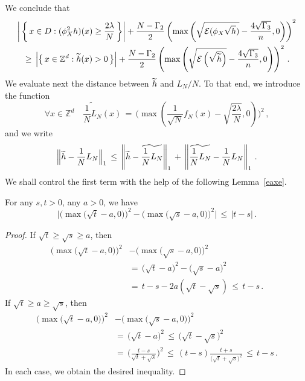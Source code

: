\documentclass[AHL, Unicode, longabstracts, published]{cedram}
\newcommand*\Zd {{\mathbb Z^d}}
\newcommand*\wh{{\tilde h}}
\newcommand{\cE}{\mathcal{E}}
\let\oldtilde\tilde
\renewcommand*{\tilde}[1]{\mathchoice{\widetilde{#1}}{\widetilde{#1}}{\oldtilde{#1}}{\oldtilde{#1}}}\let\oldhat\hat
\renewcommand*{\hat}[1]{\mathchoice{\widehat{#1}}{\widehat{#1}}{\oldhat{#1}}{\oldhat{#1}}}\let\oldexists\exists
\renewcommand*{\exists}{\mathrel{\oldexists}}
\let\oldforall\forall
\renewcommand*{\forall}{\mathrel{\oldforall}}
\begin{document}
We conclude that
\begin{multline}\label{qfrt}
\left|\,\left\{\,x\in D: (\phi_X^2h)(x)\geq\frac{2\lambda}{N}
\,\right\}\right|+
\frac{N-\Gamma_2}{2}
\left(\max
\left(\sqrt{\cE(\phi_X\sqrt{h})}-
\frac{4\sqrt{\Gamma_3}}{n},0 \right) \right)^2
\\
\,\geq\,
\Big|\big\{\,x\in\Zd:\wh(x)>0\,\big\}\Big| +\frac{N-\Gamma_2}{2}
\left(\max\left(
\sqrt{\cE\left(\sqrt{\widetilde h}\right)}-
\frac{4\sqrt{\Gamma_3}}{n},0\right) \right)^2 \,.
\end{multline}
We evaluate next the distance between $\wh$ and $L_N/N$. To that end, we introduce the function
\[
\forall x \in\Zd\quad
\widetilde{\frac{1}{N}L_N}(x)\,=\,\Bigg(\max\left({\frac{1}{\sqrt N}f_N}(x)-
\sqrt{\frac{2\lambda}{N}},0\right)\Bigg)^2\,,
\]
and we write
\begin{equation}\label{tgu}
\Big\|\wh-\frac{1}{N}L_N\Big\|_{1}\,\leq\,
\left\|\wh-\widetilde{\frac{1}{N}L_N}\right\|_{1}\,+\,
\left\| {\widetilde {\frac{1}{N}L_N}}-
\frac{1}{N}L_N\right\|_{1}\,.
\end{equation}
We shall control the first term with the help of the following Lemma~\ref{eaxe}.
\begin{lemm}\label{eaxe}
For any $s,t>0$, any $a>0$, we have
\[
\Big|
\Big(\max\big(\sqrt{t}-a,0\big)\Big)^2 -
\Big(\max\big(\sqrt{s}-a,0\big)\Big)^2
\Big|\,\leq\,|t-s|\,.
\]
\end{lemm}
\begin{proof}
If $\sqrt{t}\geq\sqrt{s}\geq a$, then
\begin{align*}
\Big(\max\big(\sqrt{t}-a,0\big)\Big)^2 &-
\Big(\max\big(\sqrt{s}-a,0\big)\Big)^2
\\
&=\,\big(\sqrt{t}-a\big)^2-
\big(\sqrt{s}-a\big)^2\\
&=\,t-s-2a(\sqrt{t}-\sqrt{s})\,\leq\,t-s\,.
\end{align*}
If $\sqrt{t}\geq a\geq\sqrt{s}$, then
\begin{align*}
\Big(\max\big(\sqrt{t}-a,0\big)\Big)^2 &-
\Big(\max\big(\sqrt{s}-a,0\big)\Big)^2
\\
&=\,\big(\sqrt{t}-a\big)^2\,\leq\,
\big(\sqrt{t}-\sqrt{s}\big)^2\\
&=\,\Big(\frac{t-s}{\sqrt{t}+\sqrt{s}}\Big)^2
\,\leq\,(t-s)
\frac{t+s}{\big(\sqrt{t}+\sqrt{s}\big)^2}\,\leq\,t-s\,.
\end{align*}
In each case, we obtain the desired inequality.
\end{proof}
\end{document}
